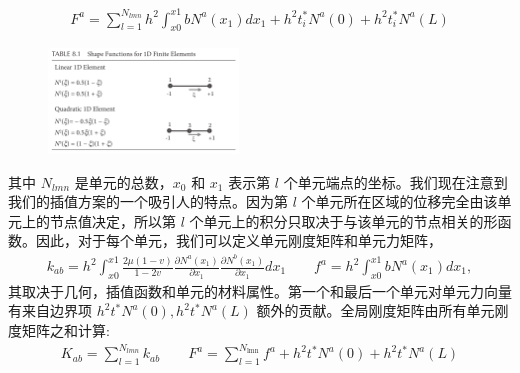 \documentclass[12pt,a4paper]{book}
\begin{document}
\begin{equation*}
    \begin{aligned}
        F^{a}=\sum_{l=1}^{N_{l m n}} h^{2} \int_{x 0}^{x 1} b N^{a}\left(x_{1}\right) d x_{1}+h^{2} t_{i}^{*} N^{a}(0)+h^{2} t_{i}^{*} N^{a}(L)
    \end{aligned}
\end{equation*}

\begin{figure}[!ht]
	\centering
	\includegraphics[width=0.45\textwidth]{Table_8_1.png}
\end{figure}
其中 $N_{lmn}$ 是单元的总数，$x_0$ 和 $x_1$ 表示第 $l$ 个单元端点的坐标。我们现在注意到我们的插值方案的一个吸引人的特点。因为第 $l$ 个单元所在区域的位移完全由该单元上的节点值决定，所以第 $l$ 个单元上的积分只取决于与该单元的节点相关的形函数。因此，对于每个单元，我们可以定义单元刚度矩阵和单元力矩阵，
\begin{equation*}
    \begin{aligned}
        k_{a b}=h^{2} \int_{x 0}^{x 1} \frac{2 \mu(1-v)}{1-2 v} \frac{\partial N^{a}\left(x_{1}\right)}{\partial x_{1}} \frac{\partial N^{b}\left(x_{1}\right)}{\partial x_{1}} d x_{1}
        \qquad
        f^{a}=h^{2} \int_{x 0}^{x 1} b N^{a}\left(x_{1}\right) d x_{1},
    \end{aligned}
\end{equation*}
其取决于几何，插值函数和单元的材料属性。第一个和最后一个单元对单元力向量有来自边界项 $h^2 t^* N^a(0), h^2 t^* N^a(L)$ 额外的贡献。全局刚度矩阵由所有单元刚度矩阵之和计算:
\begin{equation*}
    \begin{aligned}
        K_{a b}=\sum_{l=1}^{N_{l m n}} k_{a b} 
        \qquad
        F^{a}=\sum_{l=1}^{N_{\operatorname{lmn}}} f^{a}+h^{2} t^{*} N^{a}(0)+h^{2} t^{*} N^{a}(L)
    \end{aligned}
\end{equation*}
\end{document}
